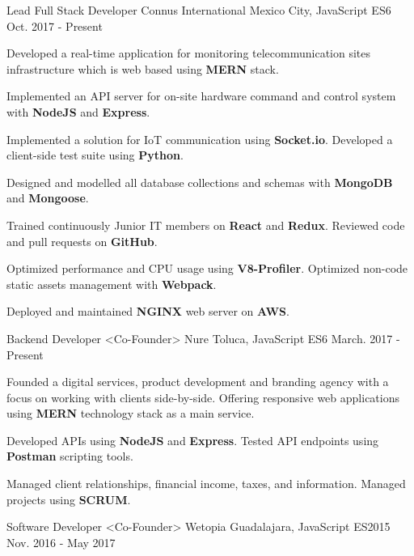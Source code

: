\begin{cventries}
  \cventry
    {Lead Full Stack Developer}
    {Connus International}
    {Mexico City, JavaScript ES6}
    {Oct. 2017 - Present}
    {
      \begin{cvitems}
        \item {Developed a real-time application for monitoring telecommunication sites infrastructure which is web based using \textbf{MERN} stack.}
        \item {Implemented an API server for on-site hardware command and control system with \textbf{NodeJS} and \textbf{Express}.}
        \item {Implemented a solution for IoT communication using \textbf{Socket.io}. Developed a client-side test suite using \textbf{Python}. }
        \item {Designed and modelled all database collections and schemas with \textbf{MongoDB} and \textbf{Mongoose}.}
        \item {Trained continuously Junior IT members on \textbf{React} and \textbf{Redux}. Reviewed code and pull requests on \textbf{GitHub}.}
        \item {Optimized performance and CPU usage using \textbf{V8-Profiler}. Optimized non-code static assets management with \textbf{Webpack}. }
        \item {Deployed and maintained \textbf{NGINX} web server on \textbf{AWS}. }
      \end{cvitems}
    }
  \cventry
    {Backend Developer <Co-Founder>}
    {Nure}
    {Toluca, JavaScript ES6}
    {March. 2017 - Present}
    {
      \begin{cvitems}
        \item {Founded a digital services, product development and branding agency with a focus on working with clients side-by-side. Offering responsive web applications using \textbf{MERN} technology stack as a main service. }
        \item {Developed APIs using \textbf{NodeJS} and \textbf{Express}. Tested API endpoints using \textbf{Postman} scripting tools.}
         \item {Managed client relationships, financial income, taxes, and information. Managed projects using \textbf{SCRUM}. }
      \end{cvitems}
    }
  \cventry
    {Software Developer <Co-Founder>}
    {Wetopia}
    {Guadalajara, JavaScript ES2015}
    {Nov. 2016 - May 2017}
    {
      \begin{cvitems}

\end{cvitems}}
\end{cventries}
